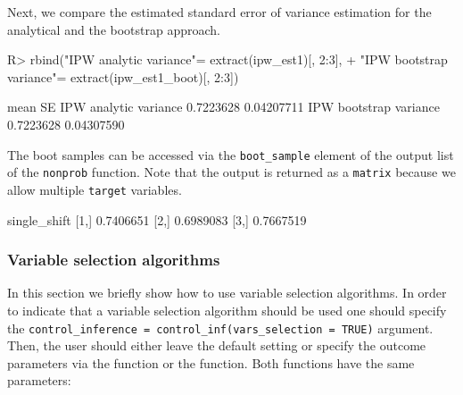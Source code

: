 \documentclass[
]{jss}
\begin{document}
Next, we compare the estimated standard error of variance estimation for
the analytical and the bootstrap approach.

\begin{CodeChunk}
\begin{CodeInput}
R> rbind("IPW analytic variance"= extract(ipw_est1)[, 2:3],
+       "IPW bootstrap variance"= extract(ipw_est1_boot)[, 2:3])
\end{CodeInput}
\begin{CodeOutput}
                            mean         SE
IPW analytic variance  0.7223628 0.04207711
IPW bootstrap variance 0.7223628 0.04307590
\end{CodeOutput}
\end{CodeChunk}

The boot samples can be accessed via the \texttt{boot\_sample} element
of the output list of the \texttt{nonprob} function. Note that the
output is returned as a \texttt{matrix} because we allow multiple
\texttt{target} variables.

\begin{CodeChunk}
\begin{CodeOutput}
     single_shift
[1,]    0.7406651
[2,]    0.6989083
[3,]    0.7667519
\end{CodeOutput}
\end{CodeChunk}

\subsubsection{Variable selection
algorithms}\label{variable-selection-algorithms}

In this section we briefly show how to use variable selection
algorithms. In order to indicate that a variable selection algorithm
should be used one should specify the
\texttt{control\_inference\ =\ control\_inf(vars\_selection\ =\ TRUE)}
argument. Then, the user should either leave the default setting or
specify the outcome parameters via the  function or
the  function. Both functions have the same
parameters:
\end{document}
